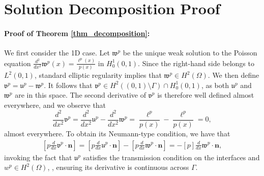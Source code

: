 \documentclass[oneside]{article}
\begin{document}
\section{Solution Decomposition Proof}\label{Solution Decomposition Proof}
\paragraph{Proof of Theorem \ref{thm_decomposition}:}
We first consider the 1D case. Let $\mathfrak{w}^p$ be the unique weak solution to the Poisson equation $\frac{d^2}{dx^2}\mathfrak{w}^p(x)=\frac{\ell^p(x)}{p(x)}$ in $H^1_0(0,1)$. Since the right-hand side belongs to $L^2(0,1)$, standard elliptic regularity implies that $\mathfrak{w}^p\in H^2(\Omega)$. We then define $\mathfrak{v}^p=\mathfrak{u}^p-\mathfrak{w}^p$. It follows that $\mathfrak{v}^p\in H^2((0,1)\setminus\Gamma)\cap H^1_0(0,1)$, as both $\mathfrak{u}^p$ and $\mathfrak{w}^p$ are in this space. The second derivative of $\mathfrak{v}^p$ is therefore well defined almost everywhere, and we observe that 
\begin{equation}
    \frac{d^2}{dx^2}\mathfrak{v}^p=\frac{d^2}{dx^2}\mathfrak{u}^p-\frac{d^2}{dx^2}\mathfrak{w}^p=\frac{\ell^p}{p(x)}-\frac{\ell^p}{p(x)}=0,
\end{equation}
almost everywhere. To obtain its Neumann-type condition, we have that 
\begin{equation}
\begin{split}
[p\frac{d}{dx}\mathfrak{v}^p\cdot\mathbf{n}] = [p\frac{d}{dx}\mathfrak{u}^p\cdot\mathbf{n}]-[p\frac{d}{dx}\mathfrak{w}^p\cdot\mathbf{n}]=-[p]\frac{d}{dx}\mathfrak{w}^p\cdot\mathbf{n},
\end{split}
\end{equation}
invoking the fact that $\mathfrak{u}^p$ satisfies the transmission condition on the interfaces and $w^p\in H^2(\Omega)$, , ensuring its derivative is continuous across $\Gamma$. 
\end{document}
